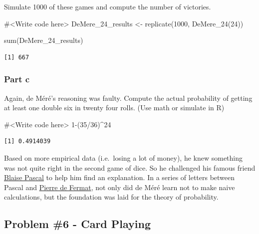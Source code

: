 \documentclass[
  letterpaper,
  DIV=11,
  numbers=noendperiod]{scrartcl}
\newenvironment{Shaded}{\begin{snugshade}}{\end{snugshade}}
\newcommand{\CommentTok}[1]{\textcolor[rgb]{0.37,0.37,0.37}{#1}}
\newcommand{\DecValTok}[1]{\textcolor[rgb]{0.68,0.00,0.00}{#1}}
\newcommand{\FunctionTok}[1]{\textcolor[rgb]{0.28,0.35,0.67}{#1}}
\newcommand{\NormalTok}[1]{\textcolor[rgb]{0.00,0.23,0.31}{#1}}
\newcommand{\OtherTok}[1]{\textcolor[rgb]{0.00,0.23,0.31}{#1}}
\newcommand{\SpecialCharTok}[1]{\textcolor[rgb]{0.37,0.37,0.37}{#1}}
\begin{document}
Simulate 1000 of these games and compute the number of victories.

\begin{Shaded}
\begin{Highlighting}[]
\CommentTok{\#\textless{}Write code here\textgreater{}}
\NormalTok{DeMere\_24\_results }\OtherTok{\textless{}{-}} \FunctionTok{replicate}\NormalTok{(}\DecValTok{1000}\NormalTok{, }\FunctionTok{DeMere\_24}\NormalTok{(}\DecValTok{24}\NormalTok{))}


\FunctionTok{sum}\NormalTok{(DeMere\_24\_results)}
\end{Highlighting}
\end{Shaded}

\begin{verbatim}
[1] 667
\end{verbatim}

\hypertarget{part-c-4}{%
\subsubsection{Part c}\label{part-c-4}}

Again, de Méré's reasoning was faulty. Compute the actual probability of
getting at least one double six in twenty four rolls. (Use math or
simulate in R)

\begin{Shaded}
\begin{Highlighting}[]
\CommentTok{\#\textless{}Write code here\textgreater{}}
\DecValTok{1}\SpecialCharTok{{-}}\NormalTok{(}\DecValTok{35}\SpecialCharTok{/}\DecValTok{36}\NormalTok{)}\SpecialCharTok{\^{}}\DecValTok{24}
\end{Highlighting}
\end{Shaded}

\begin{verbatim}
[1] 0.4914039
\end{verbatim}

Based on more empirical data (i.e.~losing a lot of money), he knew
something was not quite right in the second game of dice. So he
challenged his famous friend
\href{https://en.wikipedia.org/wiki/Blaise_Pascal}{Blaise Pascal} to
help him find an explanation. In a series of letters between Pascal and
\href{https://en.wikipedia.org/wiki/Pierre_de_Fermat}{Pierre de Fermat},
not only did de Méré learn not to make naive calculations, but the
foundation was laid for the theory of probability.

\hypertarget{problem-6---card-playing}{%
\subsection{Problem \#6 - Card Playing}\label{problem-6---card-playing}}
\end{document}
